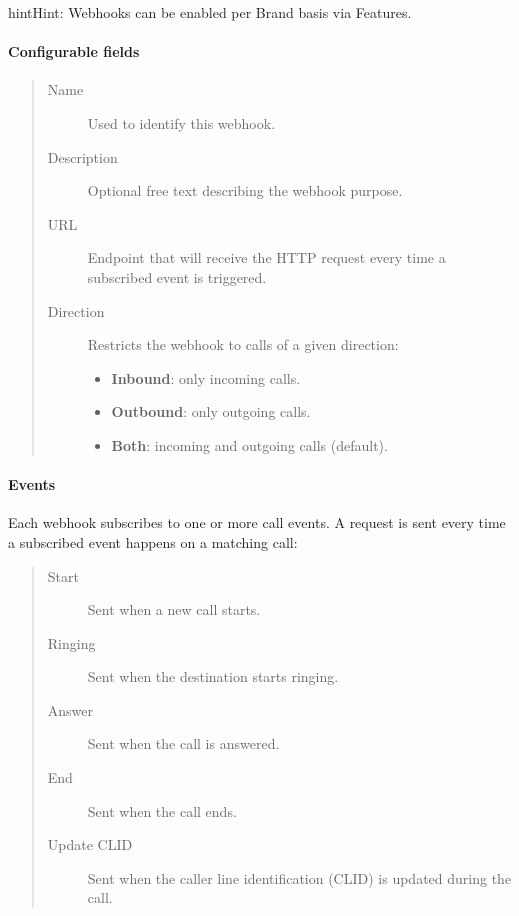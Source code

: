 \documentclass[letterpaper,10pt,english]{sphinxmanual}
\begin{document}
\begin{notice}{hint}{Hint:}
Webhooks can be enabled per Brand basis via Features.
\end{notice}


\paragraph{Configurable fields}
\label{administration_portal/client/vpbx/calls/webhooks:configurable-fields}\begin{quote}
\begin{description}
\item[{Name}] \leavevmode
Used to identify this webhook.

\item[{Description}] \leavevmode
Optional free text describing the webhook purpose.

\item[{URL}] \leavevmode
Endpoint that will receive the HTTP  request every time a subscribed event is triggered.

\item[{Direction}] \leavevmode
Restricts the webhook to calls of a given direction:
\begin{itemize}
\item {} 
\textbf{Inbound}: only incoming calls.

\item {} 
\textbf{Outbound}: only outgoing calls.

\item {} 
\textbf{Both}: incoming and outgoing calls (default).

\end{itemize}

\end{description}
\end{quote}


\paragraph{Events}
\label{administration_portal/client/vpbx/calls/webhooks:events}
Each webhook subscribes to one or more call events. A  request is sent every time a subscribed
event happens on a matching call:
\begin{quote}
\begin{description}
\item[{Start}] \leavevmode
Sent when a new call starts.

\item[{Ringing}] \leavevmode
Sent when the destination starts ringing.

\item[{Answer}] \leavevmode
Sent when the call is answered.

\item[{End}] \leavevmode
Sent when the call ends.

\item[{Update CLID}] \leavevmode
Sent when the caller line identification (CLID) is updated during the call.

\end{description}
\end{quote}
\end{document}
